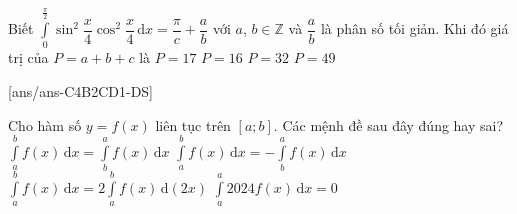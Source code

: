 \begin{ex}%
	Biết $\displaystyle\int\limits_0^{\tfrac{\pi}{2}}\sin^2\dfrac{x}{4}{\cos^2}\dfrac{x}{4}\mathrm{\,d}x=\dfrac{\pi}{c}+\dfrac{a}{b}$ với $a$, $b\in\mathbb{Z}$ và $\dfrac{a}{b}$ là phân số tối giản. Khi đó giá trị của $ P=a+b+c$ là
	\choice
	{$ P=17$}
	{$ P=16$}
	{$ P=32$}
	{\True $ P=49$}
\end{ex}
\TNTF
{}[ans/ans-C4B2CD1-DS]
\begin{ex}%
	Cho hàm số $y=f(x)$ liên tục trên $\left[a;b\right]$. Các mệnh đề sau đây đúng hay sai?
	\choiceTF
	{$\displaystyle\int\limits_a^b{f(x)\mathrm{\,d}x}=\displaystyle\int\limits_b^a{f(x)\mathrm{\,d}x}$}
	{\True $\displaystyle\int\limits_a^b{f(x)\mathrm{\,d}x}=-\displaystyle\int\limits_b^a{f(x)\mathrm{\,d}x}$}
	{$\displaystyle\int\limits_a^bf(x)\mathrm{\,d}x=2\displaystyle\int\limits_a^bf(x)\mathrm{\,d}\left(2x\right)$}
	{\True $\displaystyle\int\limits_a^a{2024f(x)\mathrm{\,d}x=0}$}
\end{ex}
%

